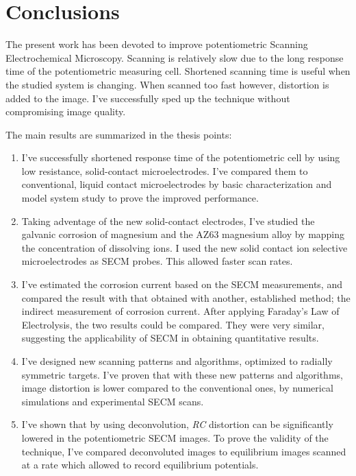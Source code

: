 \chapter{Conclusions}
\pagestyle{plain}
The present work has been devoted to improve potentiometric Scanning Electrochemical Microscopy.
Scanning is relatively slow due to the long response time of the potentiometric measuring cell.
Shortened scanning time is useful when the studied system is changing.
When scanned too fast however, distortion is added to the image.
I've successfully sped up the technique without compromising image quality.

The main results are summarized in the thesis points:

\begin{enumerate}
\item I've successfully shortened response time of the potentiometric cell by using low resistance, solid-contact microelectrodes.
I've compared them to conventional, liquid contact microelectrodes by basic characterization and model system study to prove the improved performance.

\item Taking adventage of the new solid-contact electrodes, I've studied the galvanic corrosion of magnesium and the AZ63 magnesium alloy by mapping the concentration of dissolving ions.
I used the new solid contact ion selective microelectrodes as SECM probes. This allowed faster scan rates.

\item I've estimated the corrosion current based on the SECM measurements, and compared the result with that obtained with another, established method; the indirect measurement of corrosion current.
After applying Faraday's Law of Electrolysis, the two results could be compared.
They were very similar, suggesting the applicability of SECM in obtaining quantitative results.

\item I've designed new scanning patterns and algorithms, optimized to radially symmetric targets.
I've proven that with these new patterns and algorithms, image distortion is lower compared to the conventional ones, by numerical simulations and experimental SECM scans.

\item I've shown that by using deconvolution, \emph{RC} distortion can be significantly lowered in the potentiometric SECM images.
To prove the validity of the technique, I've compared deconvoluted images to equilibrium images scanned at a rate which allowed to record equilibrium potentials.


\end{enumerate}
